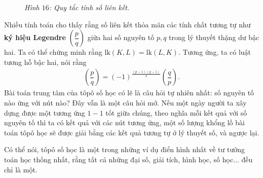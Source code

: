 \begin{multicols}{2}
\begin{figure}[H]
		\caption{\small\textit{\color{duongvaotoanhoc}Hình $16$: Quy tắc tính số liên kết.}}
		\vspace*{-10pt}
	\end{figure}
	Nhiều tính toán cho thấy rằng số liên kết thỏa mãn các tính chất tương tự như {\bf\color{duongvaotoanhoc} ký hiệu Legendre} $\left(\dfrac{p}{q}\right)$ giữa hai số nguyên tố $p, q$ trong lý thuyết thặng dư bậc hai. Ta có thể chứng minh rằng $\text{lk}(K,L) = \text{lk}(L,K)$. Tương ứng, ta có luật tương hỗ bậc hai, nói rằng 
	\begin{align*}
		\left(\dfrac{p}{q}\right) = (-1)^{\tfrac{(p-1)(q-1)}{4}}\left(\dfrac{q}{p}\right).
	\end{align*}
	Bài toán trung tâm của tôpô số học có lẽ là câu hỏi tự nhiên nhất: số nguyên tố nào ứng với nút nào? Đây vẫn là một câu hỏi mở. Nếu một ngày người ta xây dựng được một tương ứng $1-1$ tốt giữa chúng, theo nghĩa mỗi kết quả với số nguyên tố thì ta có kết quả với các nút tương ứng, một số lượng khổng lồ bài toán tôpô học sẽ được giải bằng các kết quả tương tự ở lý thuyết số, và ngược lại.
	
	 Có thể nói, tôpô số học là một trong những ví dụ điển hình nhất về tư tưởng toán học thống nhất, rằng tất cả những đại số, giải tích, hình học, số học... đều chỉ là một.
\end{multicols}